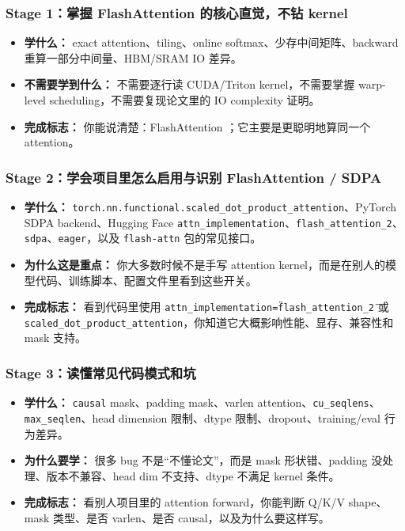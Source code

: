 \subsubsection*{Stage 1：掌握 FlashAttention 的核心直觉，不钻 kernel}

\begin{itemize}[leftmargin=1.5em]
  \item \textbf{学什么：} exact attention、tiling、online softmax、少存中间矩阵、backward 重算一部分中间量、HBM/SRAM IO 差异。
  \item \textbf{不需要学到什么：} 不需要逐行读 CUDA/Triton kernel，不需要掌握 warp-level scheduling，不需要复现论文里的 IO complexity 证明。
  \item \textbf{完成标志：} 你能说清楚：FlashAttention ；它主要是更聪明地算同一个 attention。
\end{itemize}

\subsubsection*{Stage 2：学会项目里怎么启用与识别 FlashAttention / SDPA}

\begin{itemize}[leftmargin=1.5em]
  \item \textbf{学什么：} \texttt{torch.nn.functional.scaled\_dot\_product\_attention}、PyTorch SDPA backend、Hugging Face \texttt{attn\_implementation}、\texttt{flash\_attention\_2}、\texttt{sdpa}、\texttt{eager}，以及 \texttt{flash-attn} 包的常见接口。
  \item \textbf{为什么这是重点：} 你大多数时候不是手写 attention kernel，而是在别人的模型代码、训练脚本、配置文件里看到这些开关。
  \item \textbf{完成标志：} 看到代码里使用 \texttt{attn\_implementation=\"flash\_attention\_2\"} 或 \texttt{scaled\_dot\_product\_attention}，你知道它大概影响性能、显存、兼容性和 mask 支持。
\end{itemize}

\subsubsection*{Stage 3：读懂常见代码模式和坑}

\begin{itemize}[leftmargin=1.5em]
  \item \textbf{学什么：} \texttt{causal} mask、padding mask、varlen attention、\texttt{cu\_seqlens}、\texttt{max\_seqlen}、head dimension 限制、dtype 限制、dropout、training/eval 行为差异。
  \item \textbf{为什么要学：} 很多 bug 不是“不懂论文”，而是 mask 形状错、padding 没处理、版本不兼容、head dim 不支持、dtype 不满足 kernel 条件。
  \item \textbf{完成标志：} 看别人项目里的 attention forward，你能判断 Q/K/V shape、mask 类型、是否 varlen、是否 causal，以及为什么要这样写。
\end{itemize}

